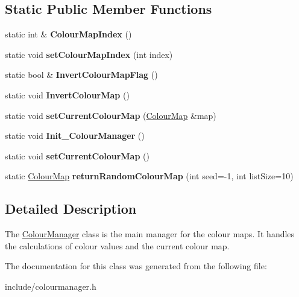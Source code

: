 \subsection*{Static Public Member Functions}
\begin{DoxyCompactItemize}
\item 
\mbox{\label{classColourManager_a77169e92057b8e4b7f8c17f69cc7c080}} 
static int \& {\bfseries Colour\+Map\+Index} ()
\item 
\mbox{\label{classColourManager_a073051c2f49306e7c4f64a4f8cb5d6c9}} 
static void {\bfseries set\+Colour\+Map\+Index} (int index)
\item 
\mbox{\label{classColourManager_a089f4867b6fad2d3fd89ee1165d32d5e}} 
static bool \& {\bfseries Invert\+Colour\+Map\+Flag} ()
\item 
\mbox{\label{classColourManager_a9feb4edb18886847206e06e1724b97fc}} 
static void {\bfseries Invert\+Colour\+Map} ()
\item 
\mbox{\label{classColourManager_ac92befd0cedb32c55e0b52ce76e0ac1e}} 
static void {\bfseries set\+Current\+Colour\+Map} (\hyperlink{classColourMap}{Colour\+Map} \&map)
\item 
\mbox{\label{classColourManager_af72400a23540302f29110fc2758e6adb}} 
static void {\bfseries Init\+\_\+\+Colour\+Manager} ()
\item 
\mbox{\label{classColourManager_a1273e07cc4c45520937e7c60873a3832}} 
static void {\bfseries set\+Current\+Colour\+Map} ()
\item 
\mbox{\label{classColourManager_af947b67fa4e61f4c5302beedcc730c8a}} 
static \hyperlink{classColourMap}{Colour\+Map} {\bfseries return\+Random\+Colour\+Map} (int seed=-\/1, int list\+Size=10)
\end{DoxyCompactItemize}


\subsection{Detailed Description}
The \hyperlink{classColourManager}{Colour\+Manager} class is the main manager for the colour maps. It handles the calculations of colour values and the current colour map. 

The documentation for this class was generated from the following file\+:\begin{DoxyCompactItemize}
\item 
include/colourmanager.\+h\end{DoxyCompactItemize}
